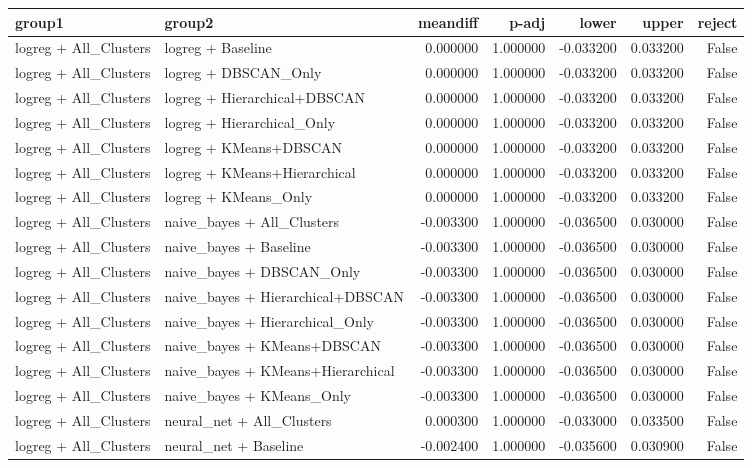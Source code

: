 \begin{tabular}{llrrrrr}
\toprule
group1 & group2 & meandiff & p-adj & lower & upper & reject \\
\midrule
logreg + All_Clusters & logreg + Baseline & 0.000000 & 1.000000 & -0.033200 & 0.033200 & False \\
logreg + All_Clusters & logreg + DBSCAN_Only & 0.000000 & 1.000000 & -0.033200 & 0.033200 & False \\
logreg + All_Clusters & logreg + Hierarchical+DBSCAN & 0.000000 & 1.000000 & -0.033200 & 0.033200 & False \\
logreg + All_Clusters & logreg + Hierarchical_Only & 0.000000 & 1.000000 & -0.033200 & 0.033200 & False \\
logreg + All_Clusters & logreg + KMeans+DBSCAN & 0.000000 & 1.000000 & -0.033200 & 0.033200 & False \\
logreg + All_Clusters & logreg + KMeans+Hierarchical & 0.000000 & 1.000000 & -0.033200 & 0.033200 & False \\
logreg + All_Clusters & logreg + KMeans_Only & 0.000000 & 1.000000 & -0.033200 & 0.033200 & False \\
logreg + All_Clusters & naive_bayes + All_Clusters & -0.003300 & 1.000000 & -0.036500 & 0.030000 & False \\
logreg + All_Clusters & naive_bayes + Baseline & -0.003300 & 1.000000 & -0.036500 & 0.030000 & False \\
logreg + All_Clusters & naive_bayes + DBSCAN_Only & -0.003300 & 1.000000 & -0.036500 & 0.030000 & False \\
logreg + All_Clusters & naive_bayes + Hierarchical+DBSCAN & -0.003300 & 1.000000 & -0.036500 & 0.030000 & False \\
logreg + All_Clusters & naive_bayes + Hierarchical_Only & -0.003300 & 1.000000 & -0.036500 & 0.030000 & False \\
logreg + All_Clusters & naive_bayes + KMeans+DBSCAN & -0.003300 & 1.000000 & -0.036500 & 0.030000 & False \\
logreg + All_Clusters & naive_bayes + KMeans+Hierarchical & -0.003300 & 1.000000 & -0.036500 & 0.030000 & False \\
logreg + All_Clusters & naive_bayes + KMeans_Only & -0.003300 & 1.000000 & -0.036500 & 0.030000 & False \\
logreg + All_Clusters & neural_net + All_Clusters & 0.000300 & 1.000000 & -0.033000 & 0.033500 & False \\
logreg + All_Clusters & neural_net + Baseline & -0.002400 & 1.000000 & -0.035600 & 0.030900 & False \\

\end{tabular}
